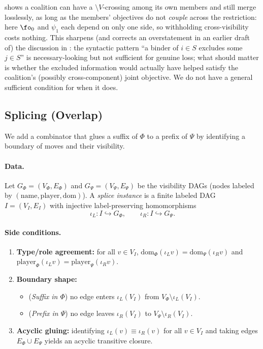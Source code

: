 \begin{remark}
 shows a coalition can have a
$\setminus V$-crossing among its own members and still merge losslessly, as
long as the members' objectives do not \emph{couple} across the restriction:
here $\fo_0$ and $\psi_1$ each depend on only one side, so withholding
cross-visibility costs nothing. This sharpens (and corrects an overstatement
in an earlier draft of) the discussion in :
the syntactic pattern ``a binder of $i\in S$ excludes some $j\in S$'' is
necessary-looking but not sufficient for genuine loss; what should matter is
whether the excluded information would actually have helped satisfy the
coalition's (possibly cross-component) joint objective. We do not have a
general sufficient condition for when it does.
\end{remark}

\subsection{Splicing (Overlap)}
\label{subsec:splice}

We add a combinator that glues a suffix of $\Phi$ to a prefix of $\Psi$ by
identifying a boundary of moves and their visibility.

\paragraph{Data.}
Let $G_\Phi=(V_\Phi,E_\Phi)$ and $G_\Psi=(V_\Psi,E_\Psi)$ be the visibility DAGs
(nodes labeled by $(\mathrm{name},\mathrm{player},\mathrm{dom})$).
A \emph{splice instance} is a finite labeled DAG $I=(V_I,E_I)$ with injective
label-preserving homomorphisms
\[
  \iota_L: I \hookrightarrow G_\Phi,
  \qquad
  \iota_R: I \hookrightarrow G_\Psi .
\]

\paragraph{Side conditions.}
\begin{enumerate}[label=(S\arabic*),leftmargin=2.2em]
\item \textbf{Type/role agreement:} for all $v\in V_I$,
  $\mathrm{dom}_\Phi(\iota_L v)=\mathrm{dom}_\Psi(\iota_R v)$ and
  $\mathrm{player}_\Phi(\iota_L v)=\mathrm{player}_\Psi(\iota_R v)$.
\item \textbf{Boundary shape:}
  \begin{itemize}
  \item (\emph{Suffix in $\Phi$}) no edge enters $\iota_L(V_I)$ from
        $V_\Phi\setminus \iota_L(V_I)$.
  \item (\emph{Prefix in $\Psi$}) no edge leaves $\iota_R(V_I)$ to
        $V_\Psi\setminus \iota_R(V_I)$.
  \end{itemize}
\item \textbf{Acyclic gluing:} identifying $\iota_L(v)\equiv\iota_R(v)$ for all
  $v\in V_I$ and taking edges $E_\Phi\cup E_\Psi$ yields an acyclic transitive closure.
\end{enumerate}

